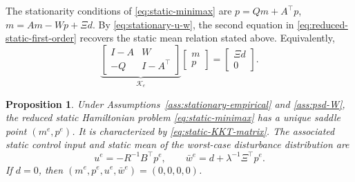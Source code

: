 \documentclass[10pt,journal,twoside]{IEEEtran}
\newtheorem{proposition}{Proposition}
\theoremstyle{definition}
\theoremstyle{remark}
\begin{document}
The stationarity conditions of
\eqref{eq:static-minimax} are
$p=Qm+A^\top p$, $m=Am-Wp+\Xi d$.
By \eqref{eq:stationary-u-w}, the second equation in
\eqref{eq:reduced-static-first-order} recovers the static mean relation
stated above. Equivalently,
\begin{equation}
	\underbrace{
		\begin{bmatrix}
			I-A & W\\
			-Q & I-A^\top
		\end{bmatrix}
	}_{\mathcal K_e}
	\begin{bmatrix}
		m\\p
	\end{bmatrix}
	=
	\begin{bmatrix}
		\Xi d\\0
	\end{bmatrix}.
	\label{eq:static-KKT-matrix}
\end{equation}


\begin{proposition}
	\label{prop:static-equilibrium}
	Under Assumptions~\ref{ass:stationary-empirical} and
	\ref{ass:psd-W}, the reduced static Hamiltonian problem
	\eqref{eq:static-minimax} has a unique saddle point
	\((m^e,p^e)\). It is characterized by
	\eqref{eq:static-KKT-matrix}. The associated static control input and
	static mean of the worst-case disturbance distribution are
	\begin{equation}
		u^e=-R^{-1}B^\top p^e,
		\qquad
		\bar w^e=d+\lambda^{-1}\Xi^\top p^e.
		\label{eq:ue-we}
	\end{equation}
	If \(d=0\), then
	$(m^e,p^e,u^e,\bar w^e)=(0,0,0,0)$.
\end{proposition}
\end{document}
